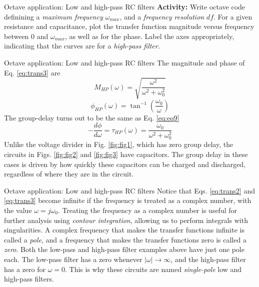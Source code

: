 \documentclass{beamer}
\begin{document}
\begin{frame}{Octave application: Low and high-pass RC filters}
\small
\textbf{Activity:} Write octave code definining a \textit{maximum frequency} $\omega_{max}$, and a \textit{frequency resolution} $df$. For a given resistance and capacitance, plot the transfer function magnitude versus frequency between $0$ and $\omega_{max}$, as well as for the phase. Label the axes appropriately, indicating that the curves are for a \textit{high-pass filter.}
\end{frame}

\begin{frame}{Octave application: Low and high-pass RC filters}
\small
The magnitude and phase of Eq. \ref{eq:trans3} are
\begin{equation}
\boxed{
M_{HP}(\omega) = \sqrt{\frac{\omega^2}{\omega^2+\omega_0^2}}
}
\label{eq:eq11}
\end{equation}
\begin{equation}
\boxed{
\phi_{HP}(\omega) = \tan^{-1}\left(\frac{\omega_0}{\omega}\right)
}
\label{eq:eq12}
\end{equation}
The group-delay turns out to be the same as Eq. \ref{eq:eq9}
\begin{equation}
\boxed{
-\frac{d\phi}{d\omega} = \tau_{HP}(\omega) = \frac{\omega_0}{\omega^2+\omega_0^2}
}
\label{eq:eq13}
\end{equation}
Unlike the voltage divider in Fig. \ref{fig:fig1}, which has zero group delay, the circuits in Figs. \ref{fig:fig2} and \ref{fig:fig3} have capacitors.  The group delay in these cases is driven by how quickly these capacitors can be charged and discharged, regardless of where they are in the circuit.
\end{frame}

\begin{frame}{Octave application: Low and high-pass RC filters}
Notice that Eqs. \ref{eq:trans2} and \ref{eq:trans3} become infinite if the frequency is treated as a complex number, with the value $\omega = j\omega_0$.  Treating the frequency as a complex number is useful for further analysis using \textit{contour integration}, allowing us to perform integrals with singularities.  A complex frequency that makes the transfer functions infinite is called a \textit{pole}, and a frequency that makes the transfer functions zero is called a \textit{zero}.  Both the low-pass and high-pass filter examples above have just one pole each.  The low-pass filter has a zero whenever $|\omega| \rightarrow \infty$, and the high-pass filter has a zero for $\omega = 0$.  This is why these circuits are named \textit{single-pole} low and high-pass filters.
\end{frame}
\end{document}

